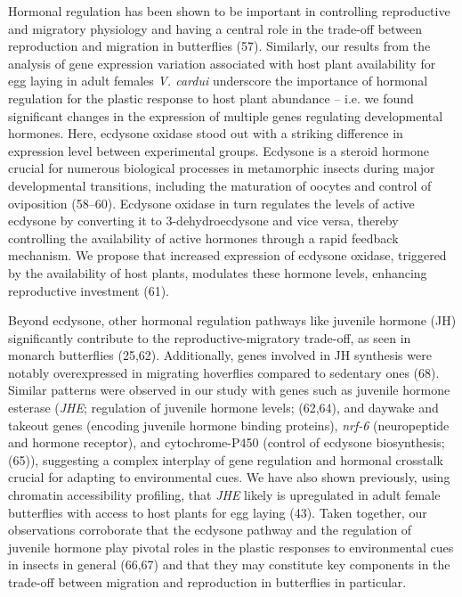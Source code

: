 \documentclass[lineno]{wiley-article}
\begin{document}
Hormonal regulation has been shown to be important in controlling reproductive and migratory physiology and having a central role in the trade-off between reproduction and migration in butterflies (57). Similarly, our results from the analysis of gene expression variation associated with host plant availability for egg laying in adult females \textit{V. cardui} underscore the importance of hormonal regulation for the plastic response to host plant abundance – i.e. we found significant changes in the expression of multiple genes regulating developmental hormones. Here, ecdysone oxidase stood out with a striking difference in expression level between experimental groups. Ecdysone is a steroid hormone crucial for numerous biological processes in metamorphic insects during major developmental transitions, including the maturation of oocytes and control of oviposition (58–60). Ecdysone oxidase in turn regulates the levels of active ecdysone by converting it to 3-dehydroecdysone and vice versa, thereby controlling the availability of active hormones through a rapid feedback mechanism. We propose that increased expression of ecdysone oxidase, triggered by the availability of host plants, modulates these hormone levels, enhancing reproductive investment (61).

Beyond ecdysone, other hormonal regulation pathways like juvenile hormone (JH) significantly contribute to the reproductive-migratory trade-off, as seen in monarch butterflies (25,62). Additionally, genes involved in JH synthesis were notably overexpressed in migrating hoverflies compared to sedentary ones (68). Similar patterns were observed in our study with genes such as juvenile hormone esterase (\textit{JHE}; regulation of juvenile hormone levels; (62,64), and daywake and takeout genes (encoding juvenile hormone binding proteins), \textit{nrf-6} (neuropeptide and hormone receptor), and cytochrome-P450 (control of ecdysone biosynthesis; (65)), suggesting a complex interplay of gene regulation and hormonal crosstalk crucial for adapting to environmental cues. We have also shown previously, using chromatin accessibility profiling, that \textit{JHE} likely is upregulated in adult female butterflies with access to host plants for egg laying (43). Taken together, our observations corroborate that the ecdysone pathway and the regulation of juvenile hormone play pivotal roles in the plastic responses to environmental cues in insects in general (66,67) and that they may constitute key components in the trade-off between migration and reproduction in butterflies in particular.
\end{document}

